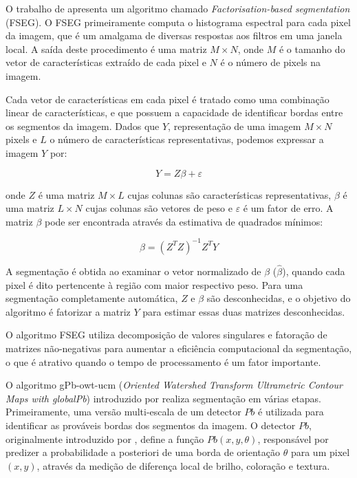 
O trabalho de  apresenta um algoritmo chamado \textit{Factorisation-based segmentation} (FSEG). O FSEG primeiramente computa o histograma espectral para cada pixel da imagem, que é um amalgama de diversas respostas aos filtros em uma janela local. A saída deste procedimento é uma matriz $M \times N$, onde $M$ é o tamanho do vetor de características extraído de cada pixel e $N$ é o número de pixels na imagem.

Cada vetor de características em cada pixel é tratado como uma combinação linear de características, e que possuem a capacidade de identificar bordas entre os segmentos da imagem. Dados que $Y$, representação de uma imagem $M \times N$ pixels e $L$ o número de características representativas, podemos expressar a imagem $Y$ por:

\begin{equation}
	\displaystyle Y = Z\beta + \varepsilon
\end{equation}

onde $Z$ é uma matriz $M \times L$ cujas colunas são características representativas, $\beta$ é uma matriz $L \times N$ cujas colunas são vetores de peso e $\varepsilon$ é um fator de erro. A matriz $\beta$ pode ser encontrada através da estimativa de quadrados mínimos:

\begin{equation}
	\displaystyle \beta = (Z^T Z)^{-1} Z^T Y
\end{equation}

A segmentação é obtida ao examinar o vetor normalizado de $\beta$ ($\hat{\beta}$), quando cada pixel é dito pertencente à região com maior respectivo peso. Para uma segmentação completamente automática, $Z$ e $\beta$ são desconhecidas, e o objetivo do algoritmo é fatorizar a matriz $Y$ para estimar essas duas matrizes desconhecidas.

O algoritmo FSEG utiliza decomposição de valores singulares e fatoração de matrizes não-negativas para aumentar a eficiência computacional da segmentação, o que é atrativo quando o tempo de processamento é um fator importante.


O algoritmo gPb-owt-ucm (\textit{Oriented Watershed Transform Ultrametric Contour Maps with globalPb}) introduzido por  realiza segmentação em várias etapas. Primeiramente, uma versão multi-escala de um detector $Pb$ é utilizada para identificar as prováveis bordas dos segmentos da imagem. O detector $Pb$, originalmente introduzido por , define a função $Pb(x,y,\theta)$, responsável por predizer a probabilidade a posteriori de uma borda de orientação $\theta$ para um pixel $(x,y)$, através da medição de diferença local de brilho, coloração e textura.

